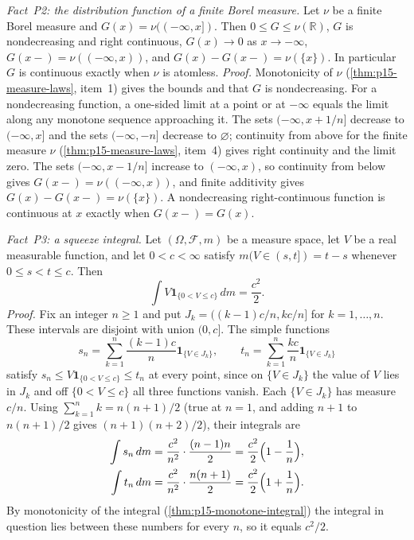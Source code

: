 \emph{Fact~P2: the distribution function of a finite Borel measure.}
Let \(\nu\) be a finite Borel measure and \(G(x)=\nu((-\infty,x])\).
Then \(0\leq G\leq\nu(\mathbb R)\), \(G\) is nondecreasing and right
continuous, \(G(x)\to0\) as \(x\to-\infty\),
\(G(x-)=\nu((-\infty,x))\), and \(G(x)-G(x-)=\nu(\{x\})\). In
particular \(G\) is continuous exactly when \(\nu\) is atomless.
\emph{Proof.} Monotonicity of \(\nu\) (\cref{thm:p15-measure-laws},
item~1) gives the bounds and that \(G\) is nondecreasing. For a
nondecreasing function, a one-sided limit at a point or at \(-\infty\)
equals the limit along any monotone sequence approaching it. The sets
\((-\infty,x+1/n]\) decrease to \((-\infty,x]\) and the sets
\((-\infty,-n]\) decrease to \(\varnothing\); continuity from above for
the finite measure \(\nu\) (\cref{thm:p15-measure-laws}, item~4) gives
right continuity and the limit zero. The sets \((-\infty,x-1/n]\)
increase to \((-\infty,x)\), so continuity from below gives
\(G(x-)=\nu((-\infty,x))\), and finite additivity gives
\(G(x)-G(x-)=\nu(\{x\})\). A nondecreasing right-continuous function is
continuous at \(x\) exactly when \(G(x-)=G(x)\).

\emph{Fact~P3: a squeeze integral.} Let \((\Omega,\mathcal F,m)\) be a
measure space, let \(V\) be a real measurable function, and let
\(0<c<\infty\) satisfy \(m(V\in(s,t])=t-s\) whenever \(0\leq s<t\leq c\).
Then
\[
 \int V\mathbf1_{\{0<V\leq c\}}\,dm=\frac{c^2}{2}.
\]
\emph{Proof.} Fix an integer \(n\geq1\) and put
\(J_k=((k-1)c/n,kc/n]\) for \(k=1,\ldots,n\). These intervals are
disjoint with union \((0,c]\). The simple functions
\[
 s_n=\sum_{k=1}^n\frac{(k-1)c}{n}\mathbf1_{\{V\in J_k\}},\qquad
 t_n=\sum_{k=1}^n\frac{kc}{n}\mathbf1_{\{V\in J_k\}}
\]
satisfy \(s_n\leq V\mathbf1_{\{0<V\leq c\}}\leq t_n\) at every point,
since on \(\{V\in J_k\}\) the value of \(V\) lies in \(J_k\) and off
\(\{0<V\leq c\}\) all three functions vanish. Each \(\{V\in J_k\}\) has
measure \(c/n\). Using \(\sum_{k=1}^nk=n(n+1)/2\) (true at \(n=1\), and
adding \(n+1\) to \(n(n+1)/2\) gives \((n+1)(n+2)/2\)), their integrals
are
\[
 \begin{aligned}
 \int s_n\,dm&=\frac{c^2}{n^2}\cdot\frac{(n-1)n}{2}
            =\frac{c^2}{2}\Bigl(1-\frac1n\Bigr),\\
 \int t_n\,dm&=\frac{c^2}{n^2}\cdot\frac{n(n+1)}{2}
            =\frac{c^2}{2}\Bigl(1+\frac1n\Bigr).
 \end{aligned}
\]
By monotonicity of the integral (\cref{thm:p15-monotone-integral}) the
integral in question lies between these numbers for every \(n\), so it
equals \(c^2/2\).


